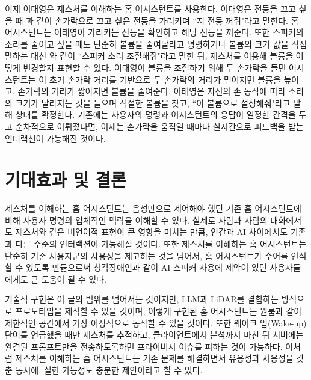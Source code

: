 이제 이태영은 제스처를 이해하는 홈 어시스턴트를 사용한다. 이태영은 전등을 끄고 싶을 때 과 같이 손가락으로 끄고 싶은 전등을 가리키며 ``저 전등 꺼줘"라고 말한다. 홈 어시스턴트는 이태영이 가리키는 전등을 확인하고 해당 전등을 꺼준다. 또한 스피커의 소리를 줄이고 싶을 때도 단순히 볼륨을 줄여달라고 명령하거나 볼륨의 크기 값을 직접 말하는 대신 와 같이 ``스피커 소리 조절해줘"라고 말한 뒤, 제스처를 이용해 볼륨을 어떻게 변경할지 표현할 수 있다. 이태영이 볼륨을 조절하기 위해 두 손가락을 들면 어시스턴트는 이 초기 손가락 거리를 기반으로 두 손가락의 거리가 멀어지면 볼륨을 높이고, 손가락의 거리가 짧아지면 볼륨을 줄여준다. 이태영은 자신의 손 동작에 따라 소리의 크기가 달라지는 것을 들으며 적절한 볼륨을 찾고, ``이 볼륨으로 설정해줘"라고 말해 상태를 확정한다. 기존에는 사용자의 명령과 어시스턴트의 응답이 일정한 간격을 두고 순차적으로 이뤄졌다면, 이제는 손가락을 움직일 때마다 실시간으로 피드백을 받는 인터랙션이 가능해진 것이다.

\section{기대효과 및 결론}

제스처를 이해하는 홈 어시스턴트는 음성만으로 제어해야 했던 기존 홈 어시스턴트에 비해 사용자 명령의 입체적인 맥락을 이해할 수 있다. 실제로 사람과 사람의 대화에서도 제스처와 같은 비언어적 표현이 큰 영향을 미치는 만큼, 인간과 AI 사이에서도 기존과 다른 수준의 인터랙션이 가능해질 것이다. 또한 제스처를 이해하는 홈 어시스턴트는 단순히 기존 사용자군의 사용성을 제고하는 것을 넘어서, 홈 어시스턴트가 수어를 인식할 수 있도록 만듦으로써 청각장애인과 같이 AI 스피커 사용에 제약이 있던 사용자들에게도 큰 도움이 될 수 있다.

기술적 구현은 이 글의 범위를 넘어서는 것이지만, LLM과 LiDAR를 결합하는 방식으로 프로토타입을 제작할 수 있을 것이며, 이렇게 구현된 홈 어시스턴트는 원룸과 같이 제한적인 공간에서 가장 이상적으로 동작할 수 있을 것이다. 또한 웨이크 업(Wake-up) 단어를 언급했을 때만 제스처를 추적하고, 클라이언트에서 분석까지 마친 뒤 서버에는 완결된 프롬프트만을 전송하도록하면 프라이버시 이슈를 피하는 것이 가능하다. 이처럼 제스처를 이해하는 홈 어시스턴트는 기존 문제를 해결하면서 유용성과 사용성을 갖춘 동시에, 실현 가능성도 충분한 제안이라고 할 수 있다.
